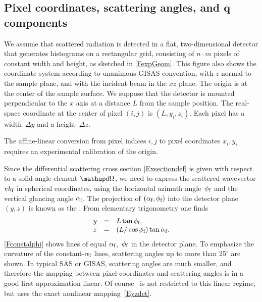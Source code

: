 \subsection{Pixel coordinates, scattering angles, and $\symbf{q}$ components}

We assume that scattered radiation is detected in a flat,
two-dimensional detector
that generates histograms on a rectangular grid,
consisting of $n\cdot m$ pixels of constant width and height,
as sketched in \cref{FexpGeom}.
This figure also shows the coordinate system
%
%
according to unanimous GISAS convention,
with $z$ normal to the sample plane,
and with the incident beam in the $xz$ plane.
The origin is at the center of the sample surface.
We suppose that the detector is mounted perpendicular to the $x$ axis
at a distance $L$ from the sample position.
The real-space coordinate at the center of pixel $(i,j)$ is $(L,y_i,z_i)$.
Each pixel has a width~$\Delta y$ and a height~$\Delta z$.
%
%

The affine-linear conversion from pixel indices $i,j$ to pixel coordinates $x_i,y_i$
requires an experimental calibration of the origin.
%

Since the differential scattering cross section \cref{Exsectiondef}
is given with respect to a solid-angle element $\d\Omega$,
we need to express the scattered wavevector $\k_\sf$ in spherical coordinates,
using the horizontal azimuth angle~$\phi_\sf$
and the vertical glancing angle $\alpha_\sf$.
The projection of $(\alpha_\sf,\phi_\sf)$ into
the detector plane~$(y,z)$ is known as the .
%
%
%
%
From elementary trigonometry one finds
\begin{equation}\label{Eyzdet}
  \begin{array}{lcl}
  y &=& L \tan\phi_\sf,\\
  z &=& (L/ \cos\phi_\sf) \tan\alpha_\sf.
  \end{array}
\end{equation}
\cref{Fconstalphi} shows lines of equal $\alpha_\sf$,~$\phi_\sf$
in the detector plane.
To emphasize the curvature of the constant-$\alpha_\sf$ lines,
scattering angles up to more than 25$^\circ$ are shown.
In typical SAS or GISAS,
scattering angles are much smaller,
and therefore the mapping between pixel coordinates and
scattering angles is in a good first approximation linear.
Of course \BornAgain\ is not restricted to this linear regime,
but uses the exact nonlinear mapping~\cref{Eyzdet}.

